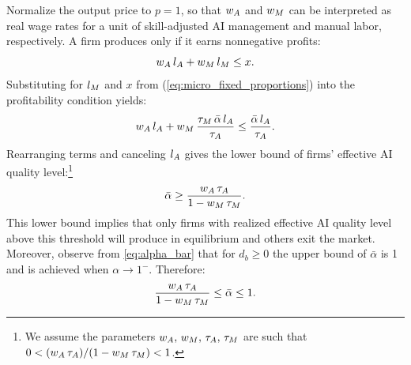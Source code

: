 Normalize the output price to $p=1$, so that $w_{A}$ and $w_{M}$ can be interpreted as real wage rates for a unit of skill-adjusted AI management and manual labor, respectively.
A firm produces only if it earns nonnegative profits:
\[
w_{A}\,l_{A}+w_{M}\,l_{M}\leq x.
\]
Substituting for $l_{M}$ and $x$ from (\ref{eq:micro_fixed_proportions}) into the profitability condition yields:
\[
w_{A}\,l_{A}+w_{M}\,\frac{\tau_{M}\,\bar{\alpha}\,l_{A}}{\tau_{A}} \leq \frac{\bar{\alpha}\,l_{A}}{\tau_{A}}.
\]
Rearranging terms and canceling $l_{A}$ gives the lower bound of firms' effective AI quality level:\footnote{We assume the parameters $w_{A},\,w_{M},\,\tau_{A},\,\tau_{M}$ are such that $0 < ({w_{A}\,\tau_{A}})/(1-w_{M}\,\tau_{M}) < 1$.}
\[
\bar{\alpha} \geq \frac{w_{A}\,\tau_{A}}{1 - w_{M}\,\tau_{M}}.
\]
This lower bound implies that only firms with realized effective AI quality level above this threshold will produce in equilibrium and others exit the market.
Moreover, observe from \eqref{eq:alpha_bar} that for $d_b \geq 0$ the upper bound of $\bar{\alpha}$ is 1 and is achieved when $\alpha \rightarrow 1^{-}$.
Therefore:
\begin{equation}
\frac{w_{A}\,\tau_{A}}{1 - w_{M}\,\tau_{M}} \leq \bar{\alpha} \leq 1.
\label{eq:alpha_threshold}
\end{equation}

